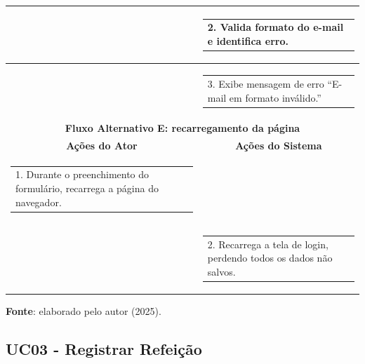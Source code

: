 \begin{longtable}[c]{|p{}|p{}|}
   \\ \hline
\multicolumn{1}{|p{0.48\textwidth}|}{} &
  \begin{tabular}[c]{@{}p{}@{}}2. Valida formato do e-mail e identifica erro.\end{tabular} \\ \hline
\multicolumn{1}{|p{0.48\textwidth}|}{} &
  \begin{tabular}[c]{@{}p{}@{}}3. Exibe mensagem de erro ``E-mail em formato inválido.''\end{tabular} \\ \hline
\multicolumn{2}{|c|}{\textbf{Fluxo Alternativo E: recarregamento da página}} \\ \hline
\multicolumn{1}{|c|}{\textbf{Ações do Ator}} &
  \multicolumn{1}{c|}{\textbf{Ações do Sistema}} \\ \hline
\multicolumn{1}{|p{0.48\textwidth}|}{\begin{tabular}[c]{@{}p{}@{}}1. Durante o preenchimento do formulário, recarrega a página do navegador.\end{tabular}} &
   \\ \hline
\multicolumn{1}{|p{0.48\textwidth}|}{} &
  \begin{tabular}[c]{@{}p{}@{}}2. Recarrega a tela de login, perdendo todos os dados não salvos.\end{tabular} \\ \hline
\end{longtable}
\begin{center}
    \small{\textbf{Fonte}: elaborado pelo autor (2025).}
\end{center}


\subsection{UC03 - Registrar Refeição}

